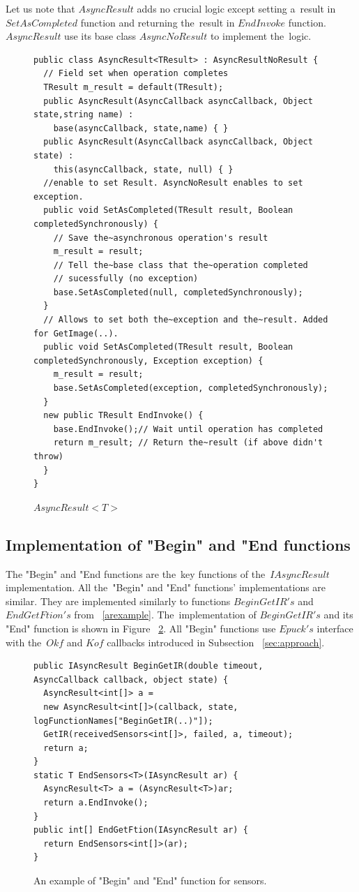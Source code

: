   Let us note that $AsyncResult$ adds no crucial logic except setting 
  a~result in $SetAsCompleted$ function and
  returning the~result in $EndInvoke$ function. 
  $AsyncResult$ use its base class $AsyncNoResult$ to implement the~logic.
\begin{figure}[!hbp]
\begin{lstlisting}
public class AsyncResult<TResult> : AsyncResultNoResult {
  // Field set when operation completes
  TResult m_result = default(TResult);
  public AsyncResult(AsyncCallback asyncCallback, Object state,string name) : 
    base(asyncCallback, state,name) { }
  public AsyncResult(AsyncCallback asyncCallback, Object state) : 
    this(asyncCallback, state, null) { }
  //enable to set Result. AsyncNoResult enables to set exception.
  public void SetAsCompleted(TResult result, Boolean completedSynchronously) {
    // Save the~asynchronous operation's result
    m_result = result;
    // Tell the~base class that the~operation completed 
    // sucessfully (no exception)
    base.SetAsCompleted(null, completedSynchronously);
  }
  // Allows to set both the~exception and the~result. Added for GetImage(..).
  public void SetAsCompleted(TResult result, Boolean completedSynchronously, Exception exception) {
    m_result = result;
    base.SetAsCompleted(exception, completedSynchronously);
  }
  new public TResult EndInvoke() {
    base.EndInvoke();// Wait until operation has completed 
    return m_result; // Return the~result (if above didn't throw)
  }
}
\end{lstlisting}
\caption{$AsyncResult<T>$} \label{result}
\end{figure}
  \subsection*{Implementation of "Begin" and "End functions} 
  The "Begin" and "End functions are the~key functions of the~$IAsyncResult$ implementation.
  All the~"Begin" and "End" functions' implementations are similar. 
  They are implemented similarly to functions $BeginGetIR's$
  and $EndGetFtion's$ from ~\ref{arexample}.
  The~implementation of $BeginGetIR's$ and its "End" function is shown in Figure ~\ref{beginsens}.
  All "Begin" functions use $Epuck's$ interface with the~$Okf$ and $Kof$ callbacks introduced
  in Subsection ~\ref{sec:approach}.	

\begin{figure}[!hbp]
\begin{lstlisting}
public IAsyncResult BeginGetIR(double timeout, AsyncCallback callback, object state) {
  AsyncResult<int[]> a = 
  new AsyncResult<int[]>(callback, state, logFunctionNames["BeginGetIR(..)"]);
  GetIR(receivedSensors<int[]>, failed, a, timeout);
  return a;
}
static T EndSensors<T>(IAsyncResult ar) {
  AsyncResult<T> a = (AsyncResult<T>)ar;
  return a.EndInvoke();
}
public int[] EndGetFtion(IAsyncResult ar) { 
  return EndSensors<int[]>(ar); 
}
\end{lstlisting}	
\caption{An example of "Begin" and "End" function for sensors.}
\label{beginsens}
\end{figure}

